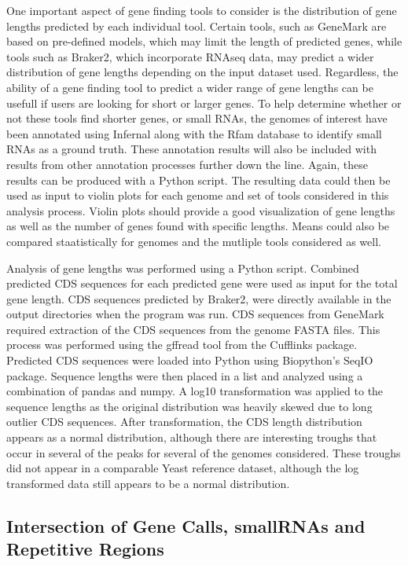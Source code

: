 One important aspect of gene finding tools to consider is the
distribution of gene lengths predicted by each individual
tool. Certain tools, such as GeneMark are based on pre-defined models,
which may limit the length of predicted genes, while tools such as
Braker2, which incorporate RNAseq data, may predict a wider
distribution of gene lengths depending on the input dataset
used. Regardless, the ability of a gene finding tool to predict a
wider range of gene lengths can be usefull if users are looking for
short or larger genes. To help determine whether or not these tools
find shorter genes, or small RNAs, the genomes of interest have been
annotated using Infernal along with the Rfam database to identify
small RNAs as a ground truth. These annotation results will also be
included with results from other annotation processes further down the
line. Again, these results can be produced with a Python script. The
resulting data could then be used as input to violin plots for each
genome and set of tools considered in this analysis process. Violin
plots should provide a good visualization of gene lengths as well as
the number of genes found with specific lengths. Means could also be
compared staatistically for genomes and the mutliple tools considered
as well.

Analysis of gene lengths was performed using a Python script. Combined
predicted CDS sequences for each predicted gene were used as input for
the total gene length. CDS sequences predicted by Braker2, were
directly available in the output directories when the program was
run. CDS sequences from GeneMark required extraction of the CDS
sequences from the genome FASTA files. This process was performed
using the gffread tool from the Cufflinks package. Predicted CDS
sequences were loaded into Python using Biopython's SeqIO
package. Sequence lengths were then placed in a list and analyzed
using a combination of pandas and numpy. A log10 transformation was
applied to the sequence lengths as the original distribution was
heavily skewed due to long outlier CDS sequences. After
transformation, the CDS length distribution appears as a normal
distribution, although there are interesting troughs that occur in
several of the peaks for several of the genomes considered. These
troughs did not appear in a comparable Yeast reference dataset,
although the log transformed data still appears to be a normal
distribution.

\subsection{Intersection of Gene Calls, smallRNAs and Repetitive Regions}

